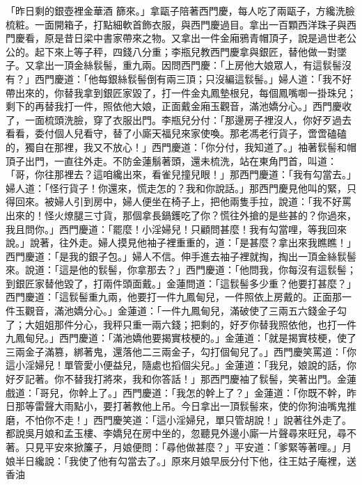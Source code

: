 「昨日剩的銀壺裡金華酒 篩來。」拿甌子陪著西門慶，每人吃了兩甌子，方纔洗臉梳粧。一面開箱子，打點細軟首飾衣服，與西門慶過目。拿出一百顆西洋珠子與西門慶看，原是昔日梁中書家帶來之物。又拿出一件金廂鴉青帽頂子，說是過世老公公的。起下來上等子秤，四錢八分重；李瓶兒教西門慶拿與銀匠，替他做一對墜子。又拿出一頂金絲䯼髻，重九兩。因問西門慶：「上房他大娘眾人，有這䯼髻沒有？」西門慶道：「他每銀絲䯼髻倒有兩三頂；只沒編這䯼髻。」婦人道：「我不好帶出來的，你替我拿到銀匠家毀了，打一件金丸鳳墊根兒，每個鳳嘴啣一掛珠兒；剩下的再替我打一件，照依他大娘，正面戴金廂玉觀音，滿池嬌分心。」西門慶收了，一面梳頭洗臉，穿了衣服出門。李瓶兒分付：「那邊房子裡沒人，你好歹過去看看，委付個人兒看守，替了小廝天福兒來家使喚。那老馮老行貨子，啻啻磕磕的，獨自在那裡，我又不放心！」西門慶道：「你分付，我知道了。」袖著䯼髻和帽頂子出門，一直往外走。不防金蓮鬅著頭，還未梳洗，站在東角門首，叫道：「哥，你往那裡去？這咱纔出來，看雀兒撞兒眼！」那西門慶道：「我有勾當去。」婦人道：「怪行貨子！你還來，慌走怎的？我和你說話。」那西門慶見他叫的緊，只得回來。被婦人引到房中，婦人便坐在椅子上，把他兩隻手拉，說道：「我不好罵出來的！怪火燎腿三寸貨，那個拿長鍋鑊吃了你？慌往外搶的是些甚的？你過來，我且問你。」西門慶道：「罷麼！小淫婦兒！只顧問甚麼！我有勾當哩，等我回來說。」說著，往外走。婦人摸見他袖子裡重重的，道：「是甚麼？拿出來我瞧瞧！」西門慶道：「是我的銀子包。」婦人不信。伸手進去袖子裡就掏，掏出一頂金絲䯼髻來。說道：「這是他的䯼髻，你拿那去？」西門慶道：「他問我，你每沒有這䯼髻；到銀匠家替他毀了，打兩件頭面戴。」金蓮問道：「這䯼髻多少重？他要打甚麼？」西門慶道：「這䯼髻重九兩，他要打一件九鳳甸兒，一件照依上房戴的。正面那一件玉觀音，滿池嬌分心。」金蓮道：「一件九鳳甸兒，滿破使了三兩五六錢金子勾了；大姐姐那件分心，我秤只重一兩六錢；把剩的，好歹你替我照依他，也打一件九鳳甸兒。」西門慶道：「滿池嬌他要揭實枝梗的。」金蓮道：「就是揭實枝梗，使了三兩金子滿篡，綁著鬼，還落他二三兩金子，勾打個甸兒了。」西門慶笑罵道：「你這小淫婦兒！單管愛小便益兒，隨處也搯個尖兒。」金蓮道：「我兒，娘說的話，你好歹記著。你不替我打將來，我和你答話！」那西門慶袖了䯼髻，笑著出門。金蓮戲道：「哥兒，你幹上了。」西門慶道：「我怎的幹上了？」金蓮道：「你既不幹，昨日那等雷聲大雨點小，要打著教他上吊。今日拿出一頂䯼髻來，使的你狗油嘴鬼推磨，不怕你不走！」西門慶笑道：「這小淫婦兒，單只管胡說！」說著往外走了。都說吳月娘和孟玉樓、李嬌兒在房中坐的，忽聽見外邊小廝一片聲尋來旺兒，尋不著。只見平安來掀簾子，月娘便問：「尋他做甚麼？」平安道：「爹緊等著哩。」月娘半日纔說：「我使了他有勾當去了。」原來月娘早辰分付下他，往王姑子庵裡，送香油 